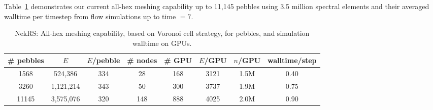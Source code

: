 Table~\ref{tab:pebble} demonstrates our current all-hex meshing capability up to 11,145 pebbles 
using 3.5 million spectral elements and their averaged walltime per timestep from flow simulations 
up to time $=7$. %
\begin{table}
  \centering
  \begin{tabular}{cccccccc}
  \hline \hline
    \# pebbles & $E$ & $E$/pebble & \# nodes & \# GPU & $E$/GPU & $n$/GPU & walltime/step \\
  \hline
   1568 & 524,386 & 334 & 28 & 168 & 3121 & 1.5M & 0.40   \\
   3260 & 1,121,214 & 343 & 50 & 300 & 3737 & 1.9M & 0.75   \\
   11145 & 3,575,076 & 320 & 148 & 888 & 4025 & 2.0M & 0.90  \\
    \hline \hline
  \end{tabular}
  \caption{NekRS: All-hex meshing capability, based on Voronoi cell strategy, for pebbles, and simulation walltime on GPUs.}
  \label{tab:pebble}
\end{table}

